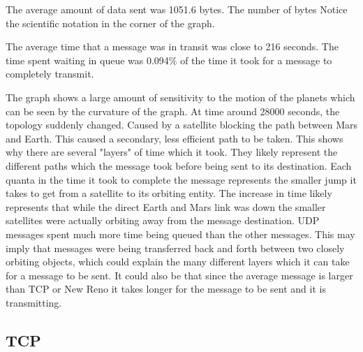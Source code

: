 \documentclass[a4paper,12pt]{article}
\begin{document}


The average amount of data sent was 
1051.6 bytes. The number of bytes 
Notice the scientific notation in the 
corner of the graph. 

The average time that a message was in transit was close to 216 seconds.
The time spent waiting in queue was 0.094\% of the time it took for a message to completely 
transmit. 

The graph shows a large amount of 
sensitivity to the motion of the planets which can be 
seen by the curvature of the graph. At time around 28000
seconds, the topology suddenly changed. Caused by a satellite
blocking the path between Mars and Earth. This caused a secondary, 
less efficient path to be taken. This shows why there are several 
"layers" of time which it took. They likely represent the different paths 
which the message took before being sent to its destination. Each quanta in
the time it took to complete the message 
represents the smaller jump it takes to get from a satellite to its 
orbiting entity. The increase in time likely represents that while the 
direct Earth and Mars link was down the smaller satellites were actually orbiting 
away from the message destination. UDP messages spent much more time being queued than 
the other messages. This may imply that messages were being transferred back and forth 
between two closely orbiting objects, which could explain the many different layers 
which it can take for a message to be sent. It could also be that since the average 
message is larger than TCP or New Reno it takes longer for the message to be sent 
and it is transmitting. 

\subsection{TCP}
\end{document}
